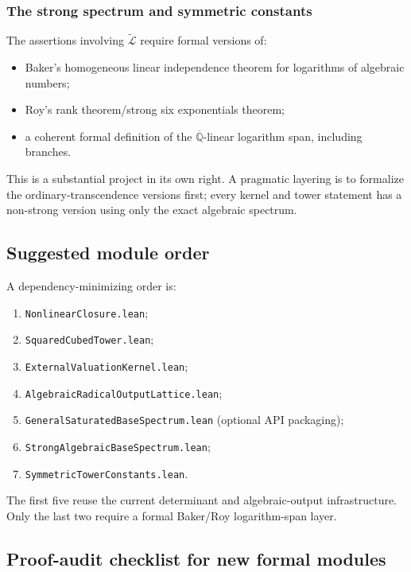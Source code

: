 \documentclass[11pt,oneside]{article}
\theoremstyle{definition}
\theoremstyle{remark}
\newcommand{\Qbar}{\overline{\mathbb Q}}
\newcommand{\LL}{\widetilde{\mathcal L}}
\begin{document}
\subsubsection{The strong spectrum and symmetric constants}

The assertions involving $\LL$ require formal versions of:

\begin{itemize}
\item Baker's homogeneous linear independence theorem for logarithms of algebraic numbers;
\item Roy's rank theorem/strong six exponentials theorem;
\item a coherent formal definition of the $\Qbar$-linear logarithm span, including branches.
\end{itemize}

This is a substantial project in its own right.  A pragmatic layering is to formalize the
ordinary-transcendence versions first; every kernel and tower statement has a non-strong
version using only the exact algebraic spectrum.

\subsection{Suggested module order}

A dependency-minimizing order is:

\begin{enumerate}
\item \texttt{NonlinearClosure.lean};
\item \texttt{SquaredCubedTower.lean};
\item \texttt{ExternalValuationKernel.lean};
\item \texttt{AlgebraicRadicalOutputLattice.lean};
\item \texttt{GeneralSaturatedBaseSpectrum.lean} (optional API packaging);
\item \texttt{StrongAlgebraicBaseSpectrum.lean};
\item \texttt{SymmetricTowerConstants.lean}.
\end{enumerate}

The first five reuse the current determinant and algebraic-output infrastructure.  Only the
last two require a formal Baker/Roy logarithm-span layer.

\subsection{Proof-audit checklist for new formal modules}
\end{document}
